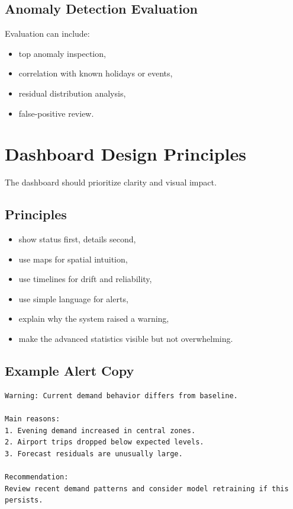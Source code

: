 \documentclass[11pt]{article}
\begin{document}
\subsection{Anomaly Detection Evaluation}

Evaluation can include:

\begin{itemize}
    \item top anomaly inspection,
    \item correlation with known holidays or events,
    \item residual distribution analysis,
    \item false-positive review.
\end{itemize}

\section{Dashboard Design Principles}

The dashboard should prioritize clarity and visual impact.

\subsection{Principles}

\begin{itemize}
    \item show status first, details second,
    \item use maps for spatial intuition,
    \item use timelines for drift and reliability,
    \item use simple language for alerts,
    \item explain why the system raised a warning,
    \item make the advanced statistics visible but not overwhelming.
\end{itemize}

\subsection{Example Alert Copy}

\begin{lstlisting}
Warning: Current demand behavior differs from baseline.

Main reasons:
1. Evening demand increased in central zones.
2. Airport trips dropped below expected levels.
3. Forecast residuals are unusually large.

Recommendation:
Review recent demand patterns and consider model retraining if this persists.
\end{lstlisting}
\end{document}
